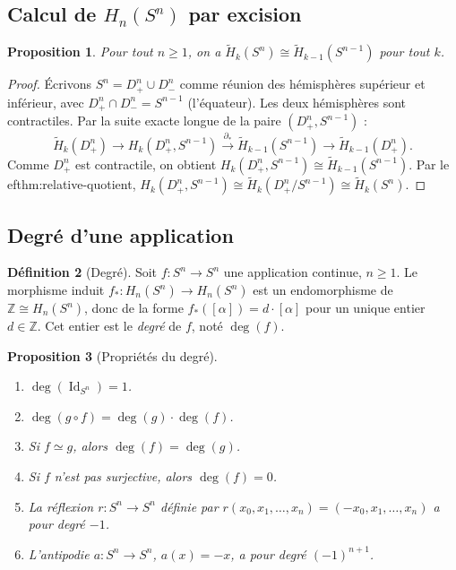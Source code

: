 \documentclass[12pt,a4paper,openany]{book}
\theoremstyle{definition}
\newtheorem{definition}{Définition}[chapter]
\theoremstyle{plain}
\newtheorem{proposition}[definition]{Proposition}
\theoremstyle{remark}
\newcommand{\Z}{\mathbb{Z}}
\DeclareMathOperator{\Id}{Id}
\begin{document}
\subsection{Calcul de $H_n(S^n)$ par excision}\label{subsec:calcul-Sn-excision}

\begin{proposition}\label{prop:Sn-excision}
Pour tout $n \geq 1$, on a $\widetilde{H}_k(S^n) \cong \widetilde{H}_{k-1}(S^{n-1})$
pour tout $k$.
\end{proposition}

\begin{proof}
Écrivons $S^n = D^n_+ \cup D^n_-$ comme réunion des hémisphères supérieur et inférieur,
avec $D^n_+ \cap D^n_- = S^{n-1}$ (l'équateur). Les deux hémisphères sont contractiles.
Par la suite exacte longue de la paire $(D^n_+, S^{n-1})$ :
\[
  \widetilde{H}_k(D^n_+) \to H_k(D^n_+, S^{n-1}) \xrightarrow{\partial_*} \widetilde{H}_{k-1}(S^{n-1}) \to \widetilde{H}_{k-1}(D^n_+).
\]
Comme $D^n_+$ est contractile, on obtient $H_k(D^n_+, S^{n-1}) \cong \widetilde{H}_{k-1}(S^{n-1})$.
Par le 
ef{thm:relative-quotient}, $H_k(D^n_+, S^{n-1}) \cong \widetilde{H}_k(D^n_+/S^{n-1}) \cong \widetilde{H}_k(S^n)$.
\end{proof}

\subsection{Degré d'une application}\label{subsec:degre}

\begin{definition}[Degré]\label{def:degre}
Soit $f \colon S^n \to S^n$ une application continue, $n \geq 1$. Le morphisme induit
$f_* \colon H_n(S^n) \to H_n(S^n)$ est un endomorphisme de $\Z \cong H_n(S^n)$, donc
de la forme $f_*([\alpha]) = d \cdot [\alpha]$ pour un unique entier $d \in \Z$.
Cet entier est le \emph{degré} de $f$, noté $\deg(f)$.
\end{definition}

\begin{proposition}[Propriétés du degré]\label{prop:proprietes-degre}
\begin{enumerate}[label=(\roman*)]
  \item $\deg(\Id_{S^n}) = 1$.
  \item $\deg(g \circ f) = \deg(g) \cdot \deg(f)$.
  \item Si $f \simeq g$, alors $\deg(f) = \deg(g)$.
  \item Si $f$ n'est pas surjective, alors $\deg(f) = 0$.
  \item La réflexion $r \colon S^n \to S^n$ définie par $r(x_0, x_1, \ldots, x_n) = (-x_0, x_1, \ldots, x_n)$
  a pour degré $-1$.
  \item L'antipodie $a \colon S^n \to S^n$, $a(x) = -x$, a pour degré $(-1)^{n+1}$.
\end{enumerate}
\end{proposition}
\end{document}
